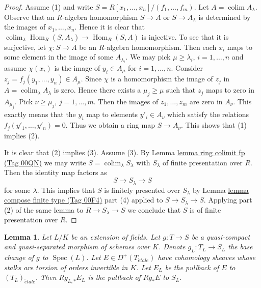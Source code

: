 \documentclass{amsart}
\theoremstyle{plain}
\newtheorem{lemma}[subsection]{Lemma}
\theoremstyle{definition}
\theoremstyle{remark}
\numberwithin{equation}{subsection}
\def\colim{\mathop{\mathrm{colim}}\nolimits}
\def\Spec{\mathop{\mathrm{Spec}}}
\def\Hom{\mathop{\mathrm{Hom}}\nolimits}
\def\etale{{\acute{e}tale}}
\begin{document}
\begin{proof}
Assume (1) and write $S = R[x_1, \ldots, x_n] / (f_1, \ldots, f_m)$.
Let $A = \colim A_\lambda$. Observe that an $R$-algebra homomorphism
$S \to A$ or $S \to A_\lambda$ is determined by the images of
$x_1, \ldots, x_n$. Hence it is clear that
$\colim_\lambda \Hom_R(S, A_\lambda) \to \Hom_R(S, A)$
is injective. To see that it is surjective, let $\chi : S \to A$
be an $R$-algebra homomorphism. Then each
$x_i$ maps to some element in the image of some $A_{\lambda_i}$.
We may pick $\mu \geq \lambda_i$, $i = 1, \ldots, n$ and
assume $\chi(x_i)$ is the image of $y_i \in A_\mu$ for
$i = 1, \ldots, n$. Consider $z_j = f_j(y_1, \ldots, y_n) \in A_\mu$.
Since $\chi$ is a homomorphism the image of $z_j$ in
$A = \colim_\lambda A_\lambda$ is zero. Hence there exists a
$\mu_j \geq \mu$ such that $z_j$ maps to zero in $A_{\mu_j}$.
Pick $\nu \geq \mu_j$, $j = 1, \ldots, m$. Then the
images of $z_1, \ldots, z_m$ are zero in $A_\nu$. This
exactly means that the $y_i$ map to elements
$y'_i \in A_\nu$ which satisfy the relations $f_j(y'_1, \ldots, y'_n) = 0$.
Thus we obtain a ring map $S \to A_\nu$. This shows that
(1) implies (2).

\medskip\noindent
It is clear that (2) implies (3). Assume (3).
By Lemma \href{https://stacks.math.columbia.edu/tag/00QN}{lemma ring colimit fp (Tag 00QN)} we may write
$S = \colim_\lambda S_\lambda$ with $S_\lambda$
of finite presentation over $R$. Then the identity map
factors as
$$
S \to S_\lambda \to S
$$
for some $\lambda$. This implies that $S$
is finitely presented over $S_\lambda$ by
Lemma \href{https://stacks.math.columbia.edu/tag/00F4}{lemma compose finite type (Tag 00F4)} part (4)
applied to $S \to S_\lambda \to S$. Applying part (2) of the same
lemma to $R \to S_\lambda \to S$ we conclude that $S$ is of finite
presentation over $R$.
\end{proof}


\begin{lemma}
\label{lemma-base-change-field-extension}
Let $L/K$ be an extension of fields. Let $g : T \to S$ be a quasi-compact
and quasi-separated morphism of schemes over $K$. Denote
$g_L : T_L \to S_L$ the base change of $g$ to $\Spec(L)$.
Let $E \in D^+(T_\etale)$ have cohomology sheaves whose stalks
are torsion of orders invertible in $K$. Let $E_L$ be the
pullback of $E$ to $(T_L)_\etale$. Then
$Rg_{L, *}E_L$ is the pullback of $Rg_*E$ to $S_L$.
\end{lemma}
\end{document}
